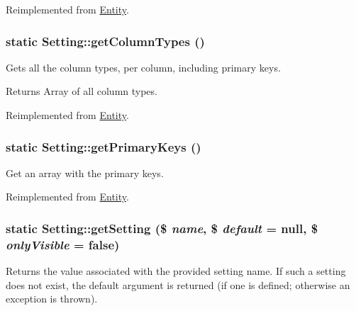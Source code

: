 Reimplemented from \hyperlink{classEntity_a394717a08ffd54ec9a14d06727c86719}{Entity}.

\hypertarget{classSetting_afde410fc459b142b11a50511414dc57d}{
\subsubsection[{getColumnTypes}]{\setlength{\rightskip}{0pt plus 5cm}static Setting::getColumnTypes ()}}
\label{classSetting_afde410fc459b142b11a50511414dc57d}
Gets all the column types, per column, including primary keys.

\begin{DoxyReturn}{Returns}
Array of all column types. 
\end{DoxyReturn}


Reimplemented from \hyperlink{classEntity_ad69437219c10955803707fbf6ac458e7}{Entity}.

\hypertarget{classSetting_a20ab54f018e4987326d20a5464c7e615}{
\subsubsection[{getPrimaryKeys}]{\setlength{\rightskip}{0pt plus 5cm}static Setting::getPrimaryKeys ()}}
\label{classSetting_a20ab54f018e4987326d20a5464c7e615}
Get an array with the primary keys. 

Reimplemented from \hyperlink{classEntity_a61bbfbb4058427174e002a09ddc77c41}{Entity}.

\hypertarget{classSetting_a693d5d8d46131900ab761ce01bb3d8cf}{
\subsubsection[{getSetting}]{\setlength{\rightskip}{0pt plus 5cm}static Setting::getSetting (\$ {\em name}, \/  \$ {\em default} = {\ttfamily null}, \/  \$ {\em onlyVisible} = {\ttfamily false})}}
\label{classSetting_a693d5d8d46131900ab761ce01bb3d8cf}
Returns the value associated with the provided setting name. If such a setting does not exist, the default argument is returned (if one is defined; otherwise an exception is thrown).



